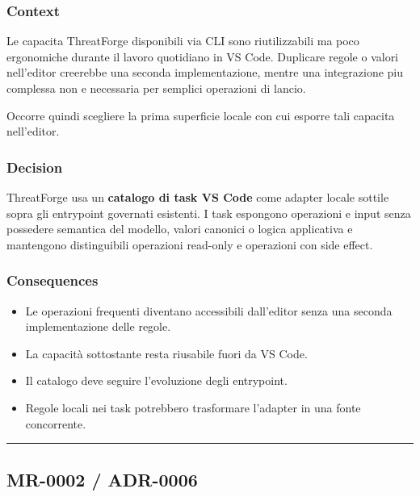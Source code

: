 \documentclass[
  10pt,
  a4paper,
]{article}
\providecommand{\tightlist}{%
  \setlength{\itemsep}{0pt}\setlength{\parskip}{0pt}}
\begin{document}
\subsubsection{Context}\label{context-12}

Le capacita ThreatForge disponibili via CLI sono riutilizzabili ma poco
ergonomiche durante il lavoro quotidiano in VS Code. Duplicare regole o
valori nell'editor creerebbe una seconda implementazione, mentre una
integrazione piu complessa non e necessaria per semplici operazioni di
lancio.

Occorre quindi scegliere la prima superficie locale con cui esporre tali
capacita nell'editor.

\subsubsection{Decision}\label{decision-12}

ThreatForge usa un \textbf{catalogo di task VS Code} come adapter locale
sottile sopra gli entrypoint governati esistenti. I task espongono
operazioni e input senza possedere semantica del modello, valori
canonici o logica applicativa e mantengono distinguibili operazioni
read-only e operazioni con side effect.

\subsubsection{Consequences}\label{consequences-12}

\begin{itemize}
\tightlist
\item
  Le operazioni frequenti diventano accessibili dall'editor senza una
  seconda implementazione delle regole.
\item
  La capacità sottostante resta riusabile fuori da VS Code.
\item
  Il catalogo deve seguire l'evoluzione degli entrypoint.
\item
  Regole locali nei task potrebbero trasformare l'adapter in una fonte
  concorrente.
\end{itemize}

\begin{center}\rule{0.5\linewidth}{0.5pt}\end{center}

\subsection{MR-0002 / ADR-0006}\label{mr-0002-adr-0006}
\end{document}
